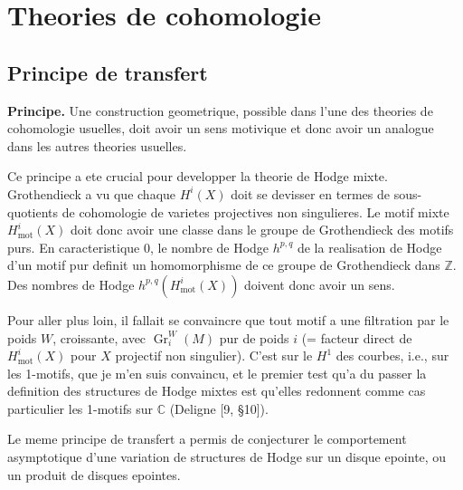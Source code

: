\documentclass[11pt,a4paper]{article}
\theoremstyle{plain}
\theoremstyle{definition}
\DeclareMathOperator{\Gr}{Gr}
\newcommand{\Z}{\mathbb{Z}}
\newcommand{\C}{\mathbb{C}}
\DeclareMathOperator{\mot}{mot}
\begin{document}
\section{Theories de cohomologie}

\subsection{Principe de transfert}

\textbf{Principe.} Une construction geometrique, possible dans l'une des theories de cohomologie usuelles, doit avoir un sens motivique et donc avoir un analogue dans les autres theories usuelles.

Ce principe a ete crucial pour developper la theorie de Hodge mixte. Grothendieck a vu que chaque $H^i(X)$ doit se devisser en termes de sous-quotients de cohomologie de varietes projectives non singulieres. Le motif mixte $H^i_{\mot}(X)$ doit donc avoir une classe dans le groupe de Grothendieck des motifs purs. En caracteristique $0$, le nombre de Hodge $h^{p,q}$ de la realisation de Hodge d'un motif pur definit un homomorphisme de ce groupe de Grothendieck dans $\Z$. Des nombres de Hodge $h^{p,q}(H^i_{\mot}(X))$ doivent donc avoir un sens.

Pour aller plus loin, il fallait se convaincre que tout motif a une filtration par le poids $W$, croissante, avec $\Gr_i^W(M)$ pur de poids $i$ (= facteur direct de $H^i_{\mot}(X)$ pour $X$ projectif non singulier). C'est sur le $H^1$ des courbes, i.e., sur les 1-motifs, que je m'en suis convaincu, et le premier test qu'a du passer la definition des structures de Hodge mixtes est qu'elles redonnent comme cas particulier les 1-motifs sur $\C$ (Deligne [9, \S10]).

Le meme principe de transfert a permis de conjecturer le comportement asymptotique d'une variation de structures de Hodge sur un disque epointe, ou un produit de disques epointes.
\end{document}
